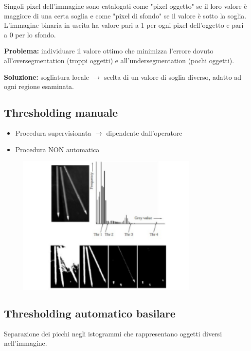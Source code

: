 Singoli pixel dell'immagine sono catalogati come "pixel oggetto" se il loro
valore è maggiore di una certa soglia e come "pixel di sfondo" se il valore è
sotto la soglia. L'immagine binaria in uscita ha valore pari a 1 per ogni pixel
dell'oggetto e pari a 0 per lo sfondo.

\begin{trivlist}
    \item \textbf{Problema:} individuare il valore ottimo che minimizza l'errore dovuto all'oversegmentation (troppi oggetti) e
    all'undersegmentation (pochi oggetti).
    \item \textbf{Soluzione:} sogliatura locale $\rightarrow$ scelta di un valore di soglia diverso,
    adatto ad ogni regione esaminata.
\end{trivlist}

\subsection{Thresholding manuale}
\begin{itemize}
    \item Procedura supervisionata $\rightarrow$ dipendente dall'operatore
    \item Procedura NON automatica
\end{itemize}

\begin{figure}[H]
    \centering
    \includegraphics[width=9cm, keepaspectratio]{capitoli/immagini/imgs/trash-manuale.png}
\end{figure}

\subsection{Thresholding automatico basilare}

Separazione dei picchi negli istogrammi che rappresentano oggetti diversi nell'immagine.

